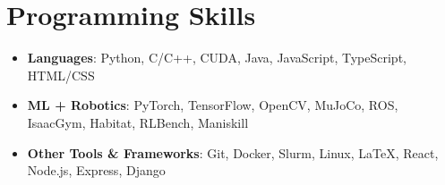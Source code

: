\documentclass[letterpaper,11pt]{article}
\begin{document}
\section{Programming Skills}
\begin{itemize}
  \item \textbf{Languages}: Python, C/C++, CUDA, Java, JavaScript, TypeScript, HTML/CSS
  \item \textbf{ML + Robotics}: PyTorch, TensorFlow, OpenCV, MuJoCo, ROS, IsaacGym, Habitat, RLBench, Maniskill
  \item \textbf{Other Tools \& Frameworks}: Git, Docker, Slurm, Linux, \LaTeX, React, Node.js, Express, Django
\end{itemize}
\end{document}

